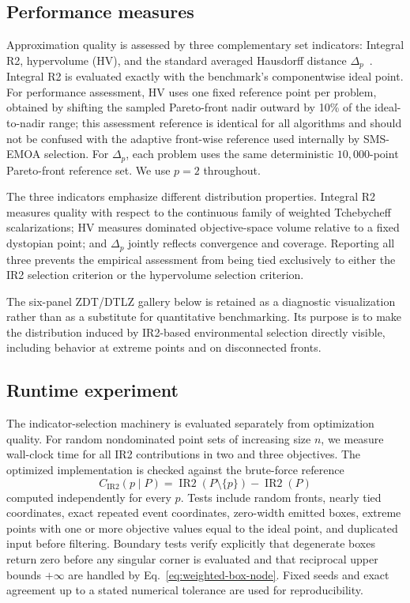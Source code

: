 \documentclass[runningheads]{llncs}
\newcommand{\IR}{\operatorname{IR2}}
\newcommand{\cIR}{C_{\IR}}
\begin{document}
\subsection{Performance measures}

Approximation quality is assessed by three complementary set indicators: Integral R2, hypervolume (HV), and the standard averaged Hausdorff distance $\Delta_p$~\cite{SchuetzeEtAl2012}. Integral R2 is evaluated exactly with the benchmark's componentwise ideal point. For performance assessment, HV uses one fixed reference point per problem, obtained by shifting the sampled Pareto-front nadir outward by 10\% of the ideal-to-nadir range; this assessment reference is identical for all algorithms and should not be confused with the adaptive front-wise reference used internally by SMS-EMOA selection. For $\Delta_p$, each problem uses the same deterministic $10{,}000$-point Pareto-front reference set. We use $p=2$ throughout.

The three indicators emphasize different distribution properties. Integral R2 measures quality with respect to the continuous family of weighted Tchebycheff scalarizations; HV measures dominated objective-space volume relative to a fixed dystopian point; and $\Delta_p$ jointly reflects convergence and coverage. Reporting all three prevents the empirical assessment from being tied exclusively to either the IR2 selection criterion or the hypervolume selection criterion.

The six-panel ZDT/DTLZ gallery below is retained as a diagnostic visualization rather than as a substitute for quantitative benchmarking. Its purpose is to make the distribution induced by IR2-based environmental selection directly visible, including behavior at extreme points and on disconnected fronts.

\subsection{Runtime experiment}

The indicator-selection machinery is evaluated separately from optimization quality. For random nondominated point sets of increasing size $n$, we measure wall-clock time for all IR2 contributions in two and three objectives. The optimized implementation is checked against the brute-force reference
\begin{equation}
    \cIR(p\mid P)=\IR(P\setminus\{p\})-\IR(P)
\end{equation}
computed independently for every $p$. Tests include random fronts, nearly tied coordinates, exact repeated event coordinates, zero-width emitted boxes, extreme points with one or more objective values equal to the ideal point, and duplicated input before filtering. Boundary tests verify explicitly that degenerate boxes return zero before any singular corner is evaluated and that reciprocal upper bounds $+\infty$ are handled by Eq.~\eqref{eq:weighted-box-node}. Fixed seeds and exact agreement up to a stated numerical tolerance are used for reproducibility.
\end{document}
